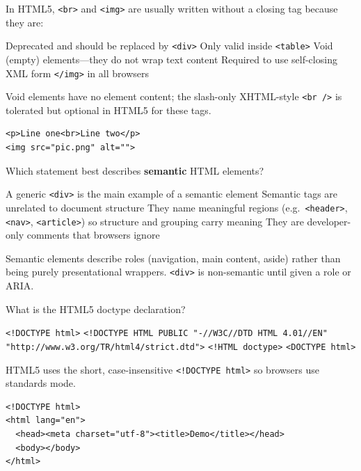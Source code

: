 \question[4]
In HTML5, \texttt{<br>} and \texttt{<img>} are usually written without a closing tag because they are:
\begin{choices}
  \choice Deprecated and should be replaced by \texttt{<div>}
  \choice Only valid inside \texttt{<table>}
  \CorrectChoice Void (empty) elements---they do not wrap text content
  \choice Required to use self-closing XML form \texttt{</img>} in all browsers
\end{choices}
\begin{solution}
  Void elements have no element content; the slash-only XHTML-style \texttt{<br />} is tolerated but optional in HTML5 for these tags.
\begin{lstlisting}[style=htmlinline]
<p>Line one<br>Line two</p>
<img src="pic.png" alt="">
\end{lstlisting}
\end{solution}

\question[4]
Which statement best describes \textbf{semantic} HTML elements?
\begin{choices}
  \choice A generic \texttt{<div>} is the main example of a semantic element
  \choice Semantic tags are unrelated to document structure
  \CorrectChoice They name meaningful regions (e.g.\ \texttt{<header>}, \texttt{<nav>}, \texttt{<article>}) so structure and grouping carry meaning
  \choice They are developer-only comments that browsers ignore
\end{choices}
\begin{solution}
  Semantic elements describe roles (navigation, main content, aside) rather than being purely presentational wrappers. \texttt{<div>} is non-semantic until given a role or ARIA.
\end{solution}

\question[4]
What is the HTML5 doctype declaration?
\begin{choices}
  \CorrectChoice \texttt{<!DOCTYPE html>}
  \choice \texttt{<!DOCTYPE HTML PUBLIC "-//W3C//DTD HTML 4.01//EN" "http://www.w3.org/TR/html4/strict.dtd">}
  \choice \texttt{<!HTML doctype>}
  \choice \texttt{<DOCTYPE html>}
\end{choices}
\begin{solution}
  HTML5 uses the short, case-insensitive \texttt{<!DOCTYPE html>} so browsers use standards mode.
\begin{lstlisting}[style=htmlinline]
<!DOCTYPE html>
<html lang="en">
  <head><meta charset="utf-8"><title>Demo</title></head>
  <body></body>
</html>
\end{lstlisting}
\end{solution}

